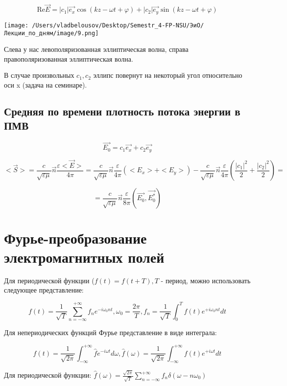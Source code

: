 \documentclass[12pt, a4paper]{report}
\begin{document}
\[ \mathrm{Re}\vec{E }= |c_1|\vec{e_x}\cos ( kz - \omega t + \varphi) + |c_2|\vec{e_y}\sin( kz - \omega t + \varphi)   \] 

\begin{center}
    \texttt{[image: /Users/vladbelousov/Desktop/Semestr\_4-FP-NSU/ЭиО/Лекции\_по\_дням/image/9.png]}
\end{center}

Слева у нас левополяризованная эллиптическая волна, справа правополяризованная эллиптическая волна.

В случае произвольных  \( c_1, c_2 \)  эллипс повернут на некоторый угол относительно оси x (задача на семинаре).

\section{Средняя по времени плотность  потока энергии в ПМВ}

\[ \vec{E_0}= c_1\vec{e_x}+ c_2 \vec{e_y} \] 

\[ <\vec{S}> = \frac{c}{\sqrt{\varepsilon \mu}} \vec{n} \frac{\varepsilon<\vec{E}>}{4 \pi} = \frac{c}{\sqrt{\varepsilon \mu}} \vec{n} \frac{\varepsilon}{4 \pi} (<E_x>+ <E_y> )-\frac{c}{\sqrt{\varepsilon \mu}}\vec{n} \frac{\varepsilon}{4 \pi}( \frac{|c_1| ^2}{2}+ \frac{|c_2| ^2}{2} )  =  \] 

\[ = \frac{c}{\sqrt{\varepsilon \mu}} \vec{n} \frac{\varepsilon}{8 \pi} ( \vec{E_0}, \vec{E_0^*} )  \] 

\chapter{Фурье-преобразование электромагнитных полей}

Для периодической функции (\( f(t)= f(t+T) ,T\) - период, можно использовать следующее представление: 

\[ f(t)= \frac{1}{\sqrt{T}} \sum_{n=- \infty }^{+ \infty }f_n e^{- i \omega_0 nt } , \omega_0 = \frac{2 \pi}{T}, f_n = \frac{1}{\sqrt{T}}  \int_{0}^{T}f(t)e^{+i \omega_0 nt} dt      \] 


Для непериодических функций Фурье представление в виде интеграла: 

\[ f(t)= \frac{1}{\sqrt{2 \pi}} \int_{-\infty }^{+\infty} \hat{f}e^{-i \omega t}d \omega, \hat{f}( \omega)= \frac{1}{\sqrt{2 \pi}} \int_{-\infty }^{+\infty}    f(t) e^{+i \omega t}dt     \] 

Для периодической функции: \( \hat{f}( \omega)= \frac{\sqrt{2\pi}}{\sqrt{T}} \sum ^{+\infty }_{n = - \infty } f_n \delta( \omega- n \omega_0)     \) 
\end{document}
